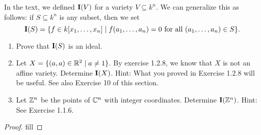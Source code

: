 \begin{exercise}{15}
In the text, we defined $\mathbf{I}(V)$ for a variety $V\subseteq k^n$. We can generalize this as follows: if $S\subseteq k^n$ is any subset, then we set
\[
\mathbf{I}(S)=\{f\in k[x_1,\dots,x_n]\mid f(a_1,\dots,a_n)=0\text{ for all }(a_1,\dots,a_n)\in S\}.
\]
\begin{enumerate}
    \item Prove that $\mathbf{I}(S)$ is an ideal.
    \item Let $X=\{(a,a)\in\mathbb{R}^2\mid a\neq 1\}$. By exercise 1.2.8, we know that $X$ is not an affine variety. Determine $\mathbf{I}(X)$. Hint: What you proved in Exercise 1.2.8 will be useful. See also Exercise 10 of this section.
    \item Let $\mathbb{Z}^n$ be the points of $\mathbb{C}^n$ with integer coordinates. Determine $\mathbf{I}(\mathbb{Z}^n)$. Hint: See Exercise 1.1.6.
\end{enumerate}
\end{exercise}
\begin{proof}
fill
\end{proof}
